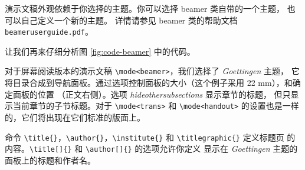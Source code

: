
演示文稿外观依赖于你选择的主题。你可以选择 beamer 类自带的一个主题，
也可以自己定义一个新的主题。
详情请参见 beamer 类的帮助文档 \texttt{beameruserguide.pdf}。

让我们再来仔细分析图 \ref{fig:code-beamer} 中的代码。


对于屏幕阅读版本的演示文稿 \verb|\mode<beamer>|，我们选择了 \emph{Goettingen} 主题，
它将目录合成到导航面板。通过选项控制面板的大小（这个例子采用 22 mm），和确定面板的位置
（正文右侧）。选项 \emph{hideothersubsections} 显示章节的标题，
但只显示当前章节的子节标题。对于
 \verb|\mode<trans>| 和 \verb|\mode<handout>| 的设置也是一样的，它们将出现在它们标准的版面上。


命令 \verb|\title{}|，\verb|\author{}|，\verb|\institute{}| 和 \verb|\titlegraphic{}| 定义标题页
的内容。\verb|\title[]{}| 和 \verb|\author[]{}| 的选项允许你定义
显示在 \emph{Goettingen} 主题的面板上的标题和作者名。


